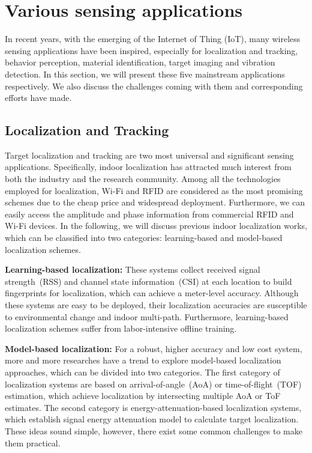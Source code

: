 \section {Various sensing applications}

In recent years, with the emerging of the Internet of Thing (IoT), many wireless sensing applications have been inspired, especially for
localization and tracking, behavior perception, material identification, target imaging and vibration detection. In this section, we will
present these five mainstream applications respectively. We also discuss the challenges coming with them and corresponding efforts have
made.

\subsection{Localization and Tracking} Target localization and tracking are two most universal and significant sensing applications.
Specifically, indoor localization has attracted much interest from both the industry and the research community. Among all the technologies
employed for localization, Wi-Fi and RFID are considered as the most promising schemes due to the cheap price and widespread deployment.
Furthermore, we can easily access the amplitude and phase information from commercial RFID and Wi-Fi devices. In the following, we will
discuss previous indoor localization works, which can be classified into two categories: learning-based and model-based localization
schemes.

\textbf{Learning-based localization:} These systems collect received signal strength~(RSS) and channel state information~(CSI) at each
location to build fingerprints for localization, which can achieve a meter-level accuracy. Although these systems are easy to be deployed,
their localization accuracies are susceptible to environmental change and indoor multi-path. Furthermore, learning-based localization
schemes suffer from labor-intensive offline training.

\textbf{Model-based localization:} For a robust, higher accuracy and low cost system, more and more researches have a trend to explore
model-based localization approaches, which can be divided into two categories. The first category of localization systems are based on
arrival-of-angle~(AoA) or time-of-flight~(TOF) estimation, which achieve localization by intersecting multiple AoA or ToF estimates. The
second category is energy-attenuation-based localization systems, which establish signal energy attenuation model to calculate target
localization. These ideas sound simple, however, there exist some common challenges to make them practical.

